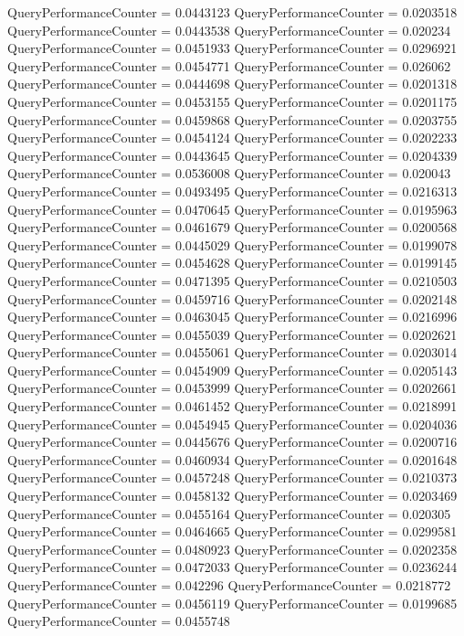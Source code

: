 \documentclass[9pt]{article}
\theoremstyle{plain}
\theoremstyle{definition}
\theoremstyle{remark}
\numberwithin{equation}{section}
\begin{document}
QueryPerformanceCounter  =  0.0443123
QueryPerformanceCounter  =  0.0203518
QueryPerformanceCounter  =  0.0443538
QueryPerformanceCounter  =  0.020234
QueryPerformanceCounter  =  0.0451933
QueryPerformanceCounter  =  0.0296921
QueryPerformanceCounter  =  0.0454771
QueryPerformanceCounter  =  0.026062
QueryPerformanceCounter  =  0.0444698
QueryPerformanceCounter  =  0.0201318
QueryPerformanceCounter  =  0.0453155
QueryPerformanceCounter  =  0.0201175
QueryPerformanceCounter  =  0.0459868
QueryPerformanceCounter  =  0.0203755
QueryPerformanceCounter  =  0.0454124
QueryPerformanceCounter  =  0.0202233
QueryPerformanceCounter  =  0.0443645
QueryPerformanceCounter  =  0.0204339
QueryPerformanceCounter  =  0.0536008
QueryPerformanceCounter  =  0.020043
QueryPerformanceCounter  =  0.0493495
QueryPerformanceCounter  =  0.0216313
QueryPerformanceCounter  =  0.0470645
QueryPerformanceCounter  =  0.0195963
QueryPerformanceCounter  =  0.0461679
QueryPerformanceCounter  =  0.0200568
QueryPerformanceCounter  =  0.0445029
QueryPerformanceCounter  =  0.0199078
QueryPerformanceCounter  =  0.0454628
QueryPerformanceCounter  =  0.0199145
QueryPerformanceCounter  =  0.0471395
QueryPerformanceCounter  =  0.0210503
QueryPerformanceCounter  =  0.0459716
QueryPerformanceCounter  =  0.0202148
QueryPerformanceCounter  =  0.0463045
QueryPerformanceCounter  =  0.0216996
QueryPerformanceCounter  =  0.0455039
QueryPerformanceCounter  =  0.0202621
QueryPerformanceCounter  =  0.0455061
QueryPerformanceCounter  =  0.0203014
QueryPerformanceCounter  =  0.0454909
QueryPerformanceCounter  =  0.0205143
QueryPerformanceCounter  =  0.0453999
QueryPerformanceCounter  =  0.0202661
QueryPerformanceCounter  =  0.0461452
QueryPerformanceCounter  =  0.0218991
QueryPerformanceCounter  =  0.0454945
QueryPerformanceCounter  =  0.0204036
QueryPerformanceCounter  =  0.0445676
QueryPerformanceCounter  =  0.0200716
QueryPerformanceCounter  =  0.0460934
QueryPerformanceCounter  =  0.0201648
QueryPerformanceCounter  =  0.0457248
QueryPerformanceCounter  =  0.0210373
QueryPerformanceCounter  =  0.0458132
QueryPerformanceCounter  =  0.0203469
QueryPerformanceCounter  =  0.0455164
QueryPerformanceCounter  =  0.020305
QueryPerformanceCounter  =  0.0464665
QueryPerformanceCounter  =  0.0299581
QueryPerformanceCounter  =  0.0480923
QueryPerformanceCounter  =  0.0202358
QueryPerformanceCounter  =  0.0472033
QueryPerformanceCounter  =  0.0236244
QueryPerformanceCounter  =  0.042296
QueryPerformanceCounter  =  0.0218772
QueryPerformanceCounter  =  0.0456119
QueryPerformanceCounter  =  0.0199685
QueryPerformanceCounter  =  0.0455748
\end{document}
